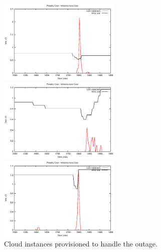 \begin{figure}[htb]
	\begin{minipage}[b]{0.32\linewidth}
		\includegraphics[height=4cm]{images/exps2011/low/ec2/penaltyVScost_filtered.eps}	
		\vspace{-4mm}
	\end{minipage}
	\hfill
	\begin{minipage}[b]{0.32\linewidth}
		\includegraphics[height=4cm]{images/exps2011/medium/ec2/penaltyVScost_filtered.eps}
		\vspace{-4mm}
	\end{minipage}
\hfill
\begin{minipage}[b]{0.32\linewidth}
		\includegraphics[height=4cm]{images/exps2011/high/ec2/penaltyVScost_filtered.eps}
		\vspace{-4mm}
	\end{minipage}
\caption{Cloud instances provisioned to handle the outage.}
\label{fig:EC2Penalty}
\end{figure}


